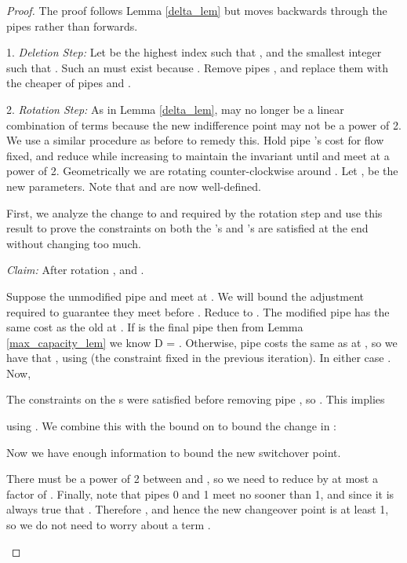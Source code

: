 \documentclass[11pt]{article}
\begin{document}
\begin{proof}  
The proof follows Lemma \ref{delta_lem} but moves backwards through the pipes rather than forwards.
\begin{description}
\item{1. \emph{Deletion Step:}}
Let  be the highest index such that , and  the smallest integer such that .  Such an  must exist because .  
Remove pipes , and replace them with the cheaper of pipes  and .

\item{2. \emph{Rotation Step:}}
As in Lemma \ref{delta_lem},  may no longer be a linear combination of terms  because the new indifference point may not be a power of 2.  We use a similar procedure as before to remedy this.
Hold pipe 's cost for  flow fixed, and reduce  while increasing  to maintain the invariant until  and  meet at a power of 2.  Geometrically we are rotating  counter-clockwise around .  Let ,  be the new parameters. Note that  and  are now well-defined.
\end{description}

First, we analyze the change to  and  required by the rotation step and use this result to prove the constraints on both the 's and 's are satisfied at the end without changing  too much.

\begin{description}
\item{\emph{Claim:}}
After rotation , and .

Suppose the unmodified pipe  and  meet at .  We will bound the adjustment required to guarantee they meet before .  
Reduce  to .
The modified pipe  has the same cost as the old at .
If  is the final pipe then from Lemma \ref{max_capacity_lem} we know D = .  
Otherwise, pipe  costs the same as  at , so we have that , using  (the constraint fixed in the previous iteration).  In either case .
Now,


The constraints on the s were satisfied before removing pipe , so .  This implies 

using .
We combine this with the bound on  to bound the change in : 


Now we have enough information to bound the new switchover point.

There must be a power of 2 between  and , so we need to reduce  by at most a factor of .
Finally, note that pipes 0 and 1 meet no sooner than 1, and  since it is always true that .  Therefore , and hence the new changeover point is at least 1, so we do not need to worry about a term .


\end{description}
\end{proof}
\end{document}
